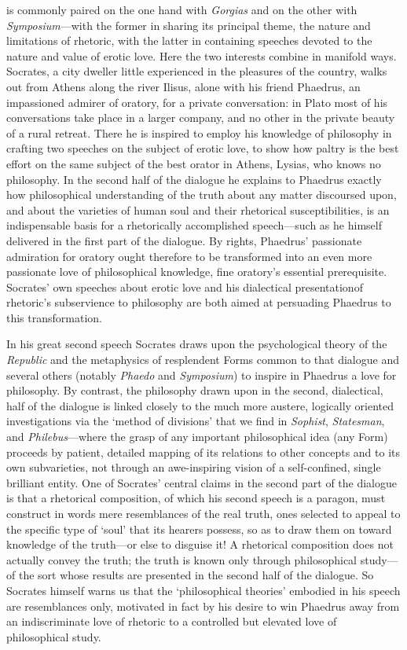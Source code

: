 \startchapter[title=Foreword to Phaedrus]

 is commonly paired on the one hand with {\em Gorgias}
and on the other with {\em Symposium}---with the former in sharing its
principal theme, the nature and limitations of rhetoric, with the
latter in containing speeches devoted to the nature and value of
erotic love. Here the two interests combine in manifold ways.
Socrates, a city dweller little experienced in the pleasures of the
country, walks out from Athens along the river Ilisus, alone with
his friend Phaedrus, an impassioned admirer of oratory, for a
private conversation: in Plato most of his conversations take
place in a larger company, and no other in the private beauty of a
rural retreat. There he is inspired to employ his knowledge of
philosophy in crafting two speeches on the subject of erotic love,
to show how paltry is the best effort on the same subject of the
best orator in Athens, Lysias, who knows no philosophy. In the
second half of the dialogue he explains to Phaedrus exactly how
philosophical understanding of the truth about any matter
discoursed upon, and about the varieties of human soul and their
rhetorical susceptibilities, is an indispensable basis for a
rhetorically accomplished speech---such as he himself delivered
in the first part of the dialogue. By rights, Phaedrus’ passionate
admiration for oratory ought therefore to be transformed into an
even more passionate love of philosophical knowledge, fine oratory’s
essential prerequisite. Socrates’ own speeches about erotic love
and his dialectical presentationof rhetoric’s subservience to
philosophy are both aimed at persuading Phaedrus to this
transformation.

In his great second speech Socrates draws upon the psychological
theory of the {\em Republic} and the metaphysics of resplendent
Forms common to that dialogue and several others (notably {\em Phaedo}
and {\em Symposium}) to inspire in Phaedrus a love for
philosophy. By contrast, the philosophy drawn upon in the second,
dialectical, half of the dialogue is linked closely to the much
more austere, logically oriented investigations via the ‘method of
divisions’ that we find in {\em Sophist}, {\em Statesman}, and
{\em Philebus}---where the grasp of any important philosophical
idea (any Form) proceeds by patient, detailed mapping of its
relations to other concepts and to its own subvarieties, not
through an awe-inspiring vision of a self-confined, single
brilliant entity. One of Socrates’ central claims in the second
part of the dialogue is that a rhetorical composition, of which his
second speech is a paragon, must construct in words mere
resemblances of the real truth, ones selected to appeal to the
specific type of ‘soul’ that its hearers possess, so as to draw
them on toward knowledge of the truth---or else to disguise it! A
rhetorical composition does not actually convey the truth; the truth
is known only through philosophical study---of the sort whose
results are presented in the second half of the dialogue. So
Socrates himself warns us that the ‘philosophical theories’
embodied in his speech are resemblances only, motivated in fact by
his desire to win Phaedrus away from an indiscriminate love of rhetoric
to a controlled but elevated love of philosophical study.

